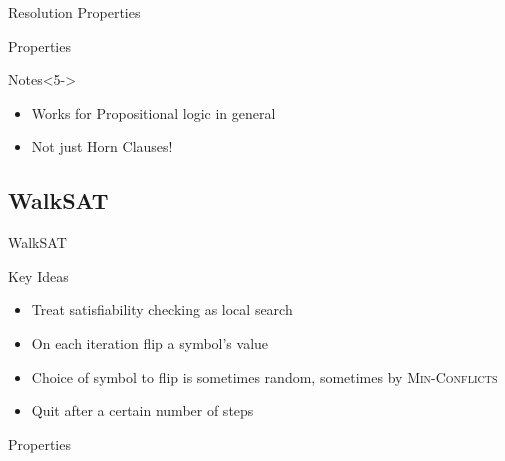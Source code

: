 \documentclass[14pt]{beamer}
\begin{document}
\begin{frame}{Resolution Properties}
\begin{block}{Properties}
\begin{description}[Complete?]
\item[Sound?] 
\item[Complete?] 
\item[Time?] 
\end{description}
\end{block}
\begin{block}{Notes}<5->
\begin{itemize}
\item Works for Propositional logic in general
\item Not just Horn Clauses!
\end{itemize}
\end{block}
\end{frame}

\subsection{WalkSAT}

\begin{frame}{WalkSAT}
\begin{block}{Key Ideas}
\begin{itemize}
\item Treat satisfiability checking as local search
\item On each iteration flip a symbol's value
\item Choice of symbol to flip is sometimes random, sometimes by \textsc{Min-Conflicts}
\item Quit after a certain number of steps
\end{itemize}
\end{block}
\begin{block}{Properties}
\begin{description}[Complete?]
\item[Sound?] 
\item[Complete?] 
\item[Time?] 
\end{description}
\end{block}
\end{frame}
\end{document}
